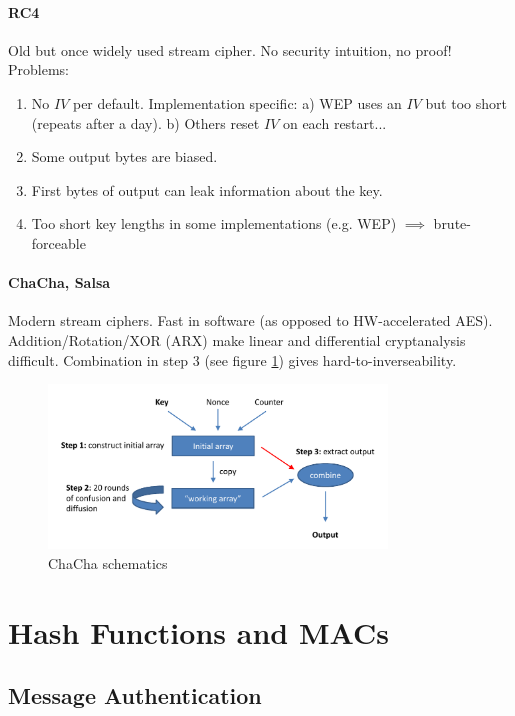 \paragraph{RC4} Old but once widely used stream cipher. No security intuition, no proof! Problems:
\begin{enumerate}
    \item No $IV$ per default. Implementation specific: a) WEP uses an $IV$ but too short (repeats after a day). b) Others reset $IV$ on each restart...
    \item Some output bytes are biased.
    \item First bytes of output can leak information about the key.
    \item Too short key lengths in some implementations (e.g. WEP) $\implies$ brute-forceable
\end{enumerate}

\paragraph{ChaCha, Salsa} Modern stream ciphers. Fast in software (as opposed to HW-accelerated AES). Addition/Rotation/XOR (ARX) make linear and differential cryptanalysis difficult. Combination in step 3 (see figure \ref{fig:sc-chacha}) gives hard-to-inverseability.

\begin{figure}[h]
    \centering
    \includegraphics[width=9cm]{images/ch3-sc-chacha.png}
    \caption{ChaCha schematics}
    \label{fig:sc-chacha}
\end{figure}



%
%
\newpage
\section{Hash Functions and MACs}

\subsection{Message Authentication}

